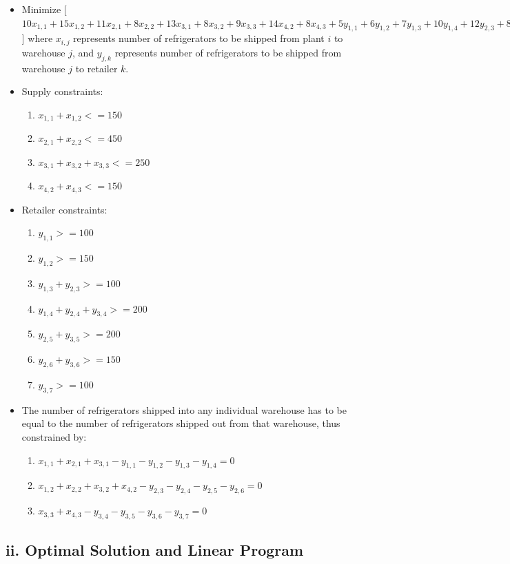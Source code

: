 \documentclass[11pt]{scrreprt}
\begin{document}
\begin{itemize}
	\item Minimize
[$10x_{1,1}+15x_{1,2}+11x_{2,1}+8x_{2,2}+13x_{3,1}+8x_{3,2}+9x_{3,3}+14x_{4,2}+8x_{4,3}+5y_{1,1}+6y_{1,2}+7y_{1,3}+10y_{1,4}+12y_{2,3}+8y_{2,4}+10y_{2,5}+14y_{2,6}+12y_{3,5}+12y_{3,6}+6y_{3,7}$] 
where $x_{i,j}$ represents number of refrigerators to be shipped 
from plant $i$ to warehouse $j$, and $y_{j,k}$ represents number of 
refrigerators to be shipped  from warehouse $j$ to retailer $k$.
	\item Supply constraints:
	\begin{enumerate}
		\item $x_{1,1} + x_{1,2} <= 150$
		\item $x_{2,1} + x_{2,2} <= 450$
		\item $x_{3,1} + x_{3,2} + x_{3,3} <= 250$
		\item $x_{4,2} + x_{4,3} <= 150$
	\end{enumerate}
	\item Retailer constraints:
	\begin{enumerate}
		\item $y_{1,1} >= 100$
		\item $y_{1,2} >= 150$
		\item $y_{1,3} + y_{2,3} >= 100$
		\item $y_{1,4} + y_{2,4} + y_{3,4} >= 200$
		\item $y_{2,5} + y_{3,5} >= 200$
		\item $y_{2,6} + y_{3,6} >= 150$
		\item $y_{3,7} >= 100$
	\end{enumerate}
	\item The number of refrigerators shipped into any individual 
		warehouse has to be equal to the number of refrigerators 
		shipped out from that warehouse, thus constrained by:
	\begin{enumerate}
		\item $x_{1,1} + x_{2,1} + x_{3,1} - y_{1,1} - y_{1,2} - y_{1,3} - y_{1,4} = 0$
		\item $x_{1,2} + x_{2,2} + x_{3,2} + x_{4,2} - y_{2,3} - y_{2,4} - y_{2,5} - y_{2,6} = 0$
		\item $x_{3,3} + x_{4,3} - y_{3,4} - y_{3,5} - y_{3,6} - y_{3,7} = 0$
	\end{enumerate}
\end{itemize}

\subsection{ii. Optimal Solution and Linear Program}
\end{document}
